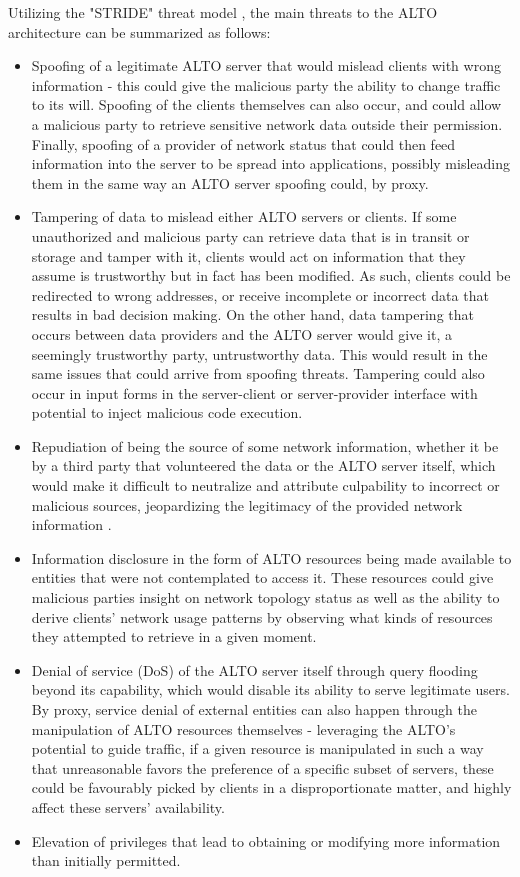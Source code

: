     Utilizing the "STRIDE" threat model , the main threats to the ALTO architecture can be summarized as follows:

\begin{itemize}
    \item Spoofing of a legitimate ALTO server that would mislead clients with wrong information - this could give the malicious party the ability to change traffic to its will.
        Spoofing of the clients themselves can also occur, and could allow a malicious party to retrieve sensitive network data outside their permission.
        Finally, spoofing of a provider of network status that could then feed information into the server to be spread into applications, possibly misleading them in the same way an ALTO server spoofing could, by proxy.
    \item Tampering of data to mislead either ALTO servers or clients.
        If some unauthorized and malicious party can retrieve data that is in transit or storage and tamper with it, clients would act on information that they assume is trustworthy but in fact has been modified.
        As such, clients could be redirected to wrong addresses, or receive incomplete or incorrect data that results in bad decision making.
        On the other hand, data tampering that occurs between data providers and the ALTO server would give it, a seemingly trustworthy party, untrustworthy data.
        This would result in the same issues that could arrive from spoofing threats.
        Tampering could also occur in input forms in the server-client or server-provider interface with potential to inject malicious code execution.
    \item Repudiation of being the source of some network information, whether it be by a third party that volunteered the data or the ALTO server itself, which would make it difficult to neutralize and attribute culpability to incorrect or malicious sources, jeopardizing the legitimacy of the provided network information .
    \item Information disclosure in the form of ALTO resources being made available to entities that were not contemplated to access it.
            These resources could give malicious parties insight on network topology status as well as the ability to derive clients' network usage patterns by observing what kinds of resources they attempted to retrieve in a given moment.
    \item Denial of service (DoS) of the ALTO server itself through query flooding beyond its capability, which would disable its ability to serve legitimate users.
        By proxy, service denial of external entities can also happen through the manipulation of ALTO resources themselves - leveraging the ALTO's potential to guide traffic, if a given resource is manipulated in such a way that unreasonable favors the preference of a specific subset of servers, these could be favourably picked by clients in a disproportionate matter, and highly affect these servers' availability.
    \item Elevation of privileges that lead to obtaining or modifying more information than initially permitted.
\end{itemize}

